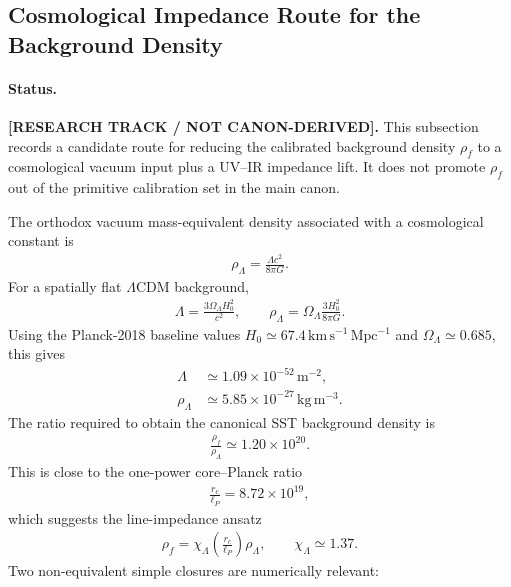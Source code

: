 
\subsection{Cosmological Impedance Route for the Background Density}
\label{sec:rt_rhof_cosmological_impedance_route}

\paragraph{Status.}
\textbf{[RESEARCH TRACK / NOT CANON-DERIVED].}
This subsection records a candidate route for reducing the calibrated
background density \(\rho_{\!f}\) to a cosmological vacuum input plus a
UV--IR impedance lift. It does not promote \(\rho_{\!f}\) out of the
primitive calibration set in the main canon.

The orthodox vacuum mass-equivalent density associated with a cosmological
constant is
\begin{align}
    \rho_\Lambda
    =
    \frac{\Lambda c^2}{8\pi G} .
\end{align}
For a spatially flat \(\Lambda\)CDM background,
\begin{align}
    \Lambda
    =
    \frac{3\Omega_\Lambda H_0^2}{c^2},
    \qquad
    \rho_\Lambda
    =
    \Omega_\Lambda\frac{3H_0^2}{8\pi G} .
\end{align}
Using the Planck-2018 baseline values
\(H_0\simeq 67.4\,\mathrm{km\,s^{-1}\,Mpc^{-1}}\) and
\(\Omega_\Lambda\simeq0.685\), this gives
\begin{align}
    \Lambda &\simeq 1.09\times10^{-52}\,\mathrm{m^{-2}},\\
    \rho_\Lambda &\simeq 5.85\times10^{-27}\,\mathrm{kg\,m^{-3}} .
\end{align}
The ratio required to obtain the canonical SST background density is
\begin{align}
    \frac{\rho_{\!f}}{\rho_\Lambda}
    \simeq
    1.20\times10^{20} .
\end{align}
This is close to the one-power core--Planck ratio
\begin{align}
    \frac{r_c}{\ell_P}
    =
    8.72\times10^{19},
\end{align}
which suggests the line-impedance ansatz
\begin{align}
    \rho_{\!f}
    =
    \chi_\Lambda
    \left(\frac{r_c}{\ell_P}\right)
    \rho_\Lambda,
    \qquad
    \chi_\Lambda
    \simeq
    1.37 .
    \label{eq:rt_rhof_lambda_chi}
\end{align}
Two non-equivalent simple closures are numerically relevant:
